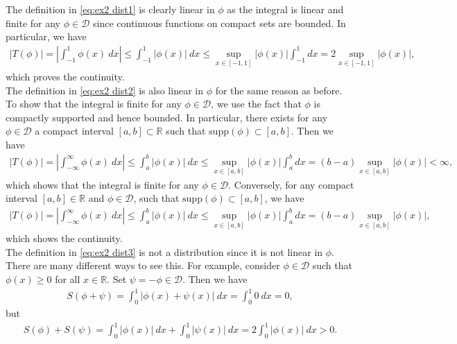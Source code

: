 \documentclass[11pt]{article}
\begin{document}
\begin{solution}
    The definition in \eqref{eq:ex2 dist1} is clearly linear in $\phi$ as the integral is linear
     and finite for any $\phi \in \mathcal{D}$ since continuous functions on compact sets are bounded. In particular, we have
     \begin{align}
            |T(\phi)| = \left| \int_{-1}^{1} \phi(x) \ dx \right| \leq \int_{-1}^{1} |\phi(x)| \ dx \leq \sup_{x \in [-1,1]} |\phi(x)| \int_{-1}^{1} dx = 2 \sup_{x \in [-1,1]} |\phi(x)|,
     \end{align}
     which proves the continuity.\\

    The definition in \eqref{eq:ex2 dist2} is also linear in $\phi$ for the same reason as before. To show that the integral is finite for any $\phi \in \mathcal{D}$, we use the fact that $\phi$ is compactly supported and hence bounded.
     In particular, there exists for any $\phi \in \mathcal{D}$ a compact interval $[a, b] \subset \mathbb{R}$ such that $\mathrm{supp}(\phi) \subset [a, b]$. Then we have
    \begin{align}
        |T(\phi)| = \left| \int_{-\infty}^{\infty} \phi(x) \ dx \right| \leq \int_{a}^{b} |\phi(x)| \ dx \leq \sup_{x \in [a,b]} |\phi(x)| \int_{a}^{b} dx = (b-a) \sup_{x \in [a,b]} |\phi(x)| < \infty,
    \end{align}
    which shows that the integral is finite for any $\phi \in \mathcal D$. Conversely, for any compact interval $[a, b] \in \mathbb{R}$ and $\phi \in \mathcal{D}$, such that $\mathrm{supp}(\phi) \subset [a, b]$, we have
    \begin{align}
        |T(\phi)| = \left| \int_{-\infty}^{\infty} \phi(x) \ dx \right| \leq \int_{a}^{b} |\phi(x)| \ dx \leq \sup_{x \in [a,b]} |\phi(x)| \int_{a}^{b} dx = (b-a) \sup_{x \in [a,b]} |\phi(x)|,
    \end{align}
    which shows the continuity.
    \\

    The definition in \eqref{eq:ex2 dist3} is not a distribution since it is not linear in $\phi$. 
	There are many different ways to see this. 
    For example, consider $\phi \in \mathcal{D}$ such that $\phi(x) \geq 0$ for all $x \in \mathbb{R}$. Set $\psi = -\phi \in \mathcal D$. Then we have
    \begin{align}
        S(\phi + \psi) = \int_0^1 |\phi(x) + \psi(x)| \ dx = \int_0^1 0 \ dx = 0,
    \end{align}
    but
    \begin{align}
        S(\phi) + S(\psi) = \int_0^1 |\phi(x)| \ dx + \int_0^1 |\psi(x)| \ dx = 2 \int_0^1 |\phi(x)| \ dx > 0.
    \end{align}
\end{solution}
\end{document}
